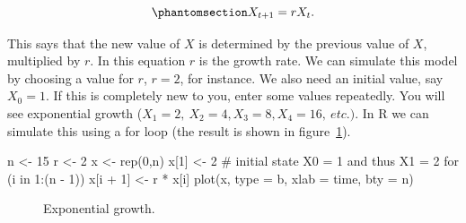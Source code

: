 \documentclass[
  a4paper,
  DIV=11,
  numbers=noendperiod,
  oneside]{scrreprt}
\newenvironment{Shaded}{}{}
\newcommand{\AttributeTok}[1]{\textcolor[rgb]{0.84,0.23,0.29}{#1}}
\newcommand{\CommentTok}[1]{\textcolor[rgb]{0.42,0.45,0.49}{#1}}
\newcommand{\ControlFlowTok}[1]{\textcolor[rgb]{0.84,0.23,0.29}{#1}}
\newcommand{\DecValTok}[1]{\textcolor[rgb]{0.00,0.36,0.77}{#1}}
\newcommand{\FunctionTok}[1]{\textcolor[rgb]{0.44,0.26,0.76}{#1}}
\newcommand{\NormalTok}[1]{\textcolor[rgb]{0.14,0.16,0.18}{#1}}
\newcommand{\OtherTok}[1]{\textcolor[rgb]{0.44,0.26,0.76}{#1}}
\newcommand{\SpecialCharTok}[1]{\textcolor[rgb]{0.00,0.36,0.77}{#1}}
\newcommand{\StringTok}[1]{\textcolor[rgb]{0.01,0.18,0.38}{#1}}
\begin{document}
\begin{equation}\phantomsection\label{eq-ch2-1}{
X_{t + 1} = rX_{t}.}\end{equation}

This says that the new value of \(X\) is determined by the previous
value of \(X\), multiplied by \(r\). In this equation \(r\) is the
growth rate. We can simulate this model by choosing a value for \(r\),
\(r=2\), for instance. We also need an initial value, say \(X_{0} = 1.\)
If this is completely new to you, enter some values repeatedly. You will
see exponential growth
(\(X_{1} = 2,\ X_{2} = 4,X_{3} = 8,X_{4} = 16,\ etc.)\). In R we can
simulate this using a for loop (the result is shown in
figure~\ref{fig-ch2-img1}).

\begin{Shaded}
\begin{Highlighting}[]
\NormalTok{n }\OtherTok{\textless{}{-}} \DecValTok{15}
\NormalTok{r }\OtherTok{\textless{}{-}} \DecValTok{2}
\NormalTok{x }\OtherTok{\textless{}{-}} \FunctionTok{rep}\NormalTok{(}\DecValTok{0}\NormalTok{,n)}
\NormalTok{x[}\DecValTok{1}\NormalTok{] }\OtherTok{\textless{}{-}} \DecValTok{2} \CommentTok{\# initial state X0 = 1 and thus X1 = 2}
\ControlFlowTok{for}\NormalTok{ (i }\ControlFlowTok{in} \DecValTok{1}\SpecialCharTok{:}\NormalTok{(n }\SpecialCharTok{{-}} \DecValTok{1}\NormalTok{))}
\NormalTok{  x[i }\SpecialCharTok{+} \DecValTok{1}\NormalTok{] }\OtherTok{\textless{}{-}}\NormalTok{ r }\SpecialCharTok{*}\NormalTok{ x[i]}
\FunctionTok{plot}\NormalTok{(x, }\AttributeTok{type =} \StringTok{\textquotesingle{}b\textquotesingle{}}\NormalTok{, }\AttributeTok{xlab =} \StringTok{\textquotesingle{}time\textquotesingle{}}\NormalTok{, }\AttributeTok{bty =} \StringTok{\textquotesingle{}n\textquotesingle{}}\NormalTok{)}
\end{Highlighting}
\end{Shaded}

\begin{figure}


\caption{\label{fig-ch2-img1}Exponential growth.}

\end{figure}%
\end{document}

